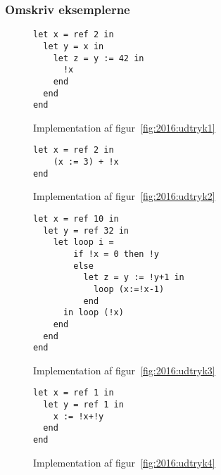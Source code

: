 \subsubsection{Omskriv eksemplerne}
\begin{figure}[!ht]
    \begin{lstlisting}[style=fsharp]
let x = ref 2 in
  let y = x in
    let z = y := 42 in
      !x
    end
  end
end
    \end{lstlisting}
    \caption{Implementation af figur~\ref{fig:2016:udtryk1}}\label{fig:2016:imp1}
\end{figure}
\begin{figure}[!ht]
\begin{lstlisting}[style=fsharp]
let x = ref 2 in 
    (x := 3) + !x 
end
\end{lstlisting}
    \caption{Implementation af figur~\ref{fig:2016:udtryk2}}\label{fig:2016:imp2}
\end{figure}
\begin{figure}[!ht]
\begin{lstlisting}[style=fsharp]
let x = ref 10 in 
  let y = ref 32 in
    let loop i =  
        if !x = 0 then !y
        else 
          let z = y := !y+1 in
            loop (x:=!x-1)
          end
      in loop (!x)
    end
  end
end
\end{lstlisting}
    \caption{Implementation af figur~\ref{fig:2016:udtryk3}}\label{fig:2016:imp2}
\end{figure}
\begin{figure}[!ht]
\begin{lstlisting}[style=fsharp]
let x = ref 1 in 
  let y = ref 1 in
    x := !x+!y
  end
end
\end{lstlisting}
    \caption{Implementation af figur~\ref{fig:2016:udtryk4}}\label{fig:2016:imp2}
\end{figure}
\newpage
